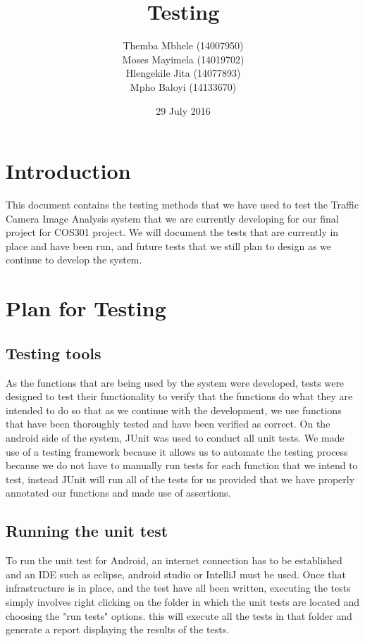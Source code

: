 \documentclass{article}
\title{Testing}
\author{Themba Mbhele (14007950)\\
        Moses Mayimela (14019702)\\
        Hlengekile Jita (14077893)\\
        Mpho Baloyi (14133670)\\
        }
\date{29 July 2016}
\begin{document}
\maketitle

\section{Introduction}
This document contains the testing methods that we have used to test the Traffic Camera Image Analysis system that we are currently developing for our final project for COS301 project. We will document the tests that are currently in place and have been run, and future tests that we still plan to design as we continue to develop the system.

\section{Plan for Testing}
\subsection{Testing tools}
As the functions that are being used by the system were developed, tests were designed to test their functionality to verify that the functions do what they are intended to do so that as we continue with the development, we use functions that have been thoroughly tested and have been verified as correct.
On the android side of the system, JUnit was used to conduct all unit tests. We
made use of a testing framework because it allows us to automate the testing process because we do not have to manually run tests for each function that we intend to test, instead JUnit will run all of the tests for us provided that we
have properly annotated our functions and made use of assertions.
\subsection{Running the unit test}
To run the unit test for Android, an internet connection has to be established and an IDE such as eclipse, android studio or IntelliJ must be used. Once that infrastructure is in place, and the test have all been written, executing the tests simply involves right clicking on the folder in which the unit tests are located and choosing the "run tests" options. this will execute all the tests in that folder and generate a report displaying the results of the tests.
\end{document}
